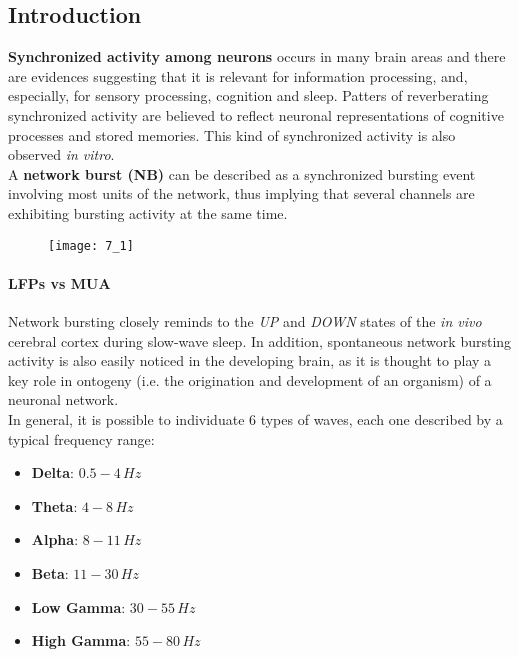 \subsection{Introduction}
\textbf{Synchronized activity among neurons} occurs in many brain areas and there are evidences
suggesting that it is relevant for information processing, and, especially, for sensory
processing, cognition and sleep. Patters of reverberating synchronized activity are
believed to reflect neuronal representations of cognitive processes and stored
memories. This kind of synchronized activity is also observed
\textit{in vitro}.\\
A \textbf{network burst (NB)} can be described as a synchronized bursting event involving most units of the network, thus implying that several channels are exhibiting bursting activity at the same time.
\begin{figure}[H]
    \texttt{[image: 7\_1]}
    \centering
\end{figure}

\paragraph{LFPs vs MUA}
Network bursting closely reminds to the \textit{UP} and \textit{DOWN} states 
of the \textit{in vivo} cerebral cortex during slow-wave sleep. 
In addition, spontaneous network bursting activity is also easily
noticed in the developing brain, as it is thought to play a key role in
ontogeny (i.e. the origination and development of an organism)
of a neuronal network.\\
In general, it is possible to individuate 6 types of waves, each one described by a typical frequency range:
\begin{itemize}
    \item \textbf{Delta}: \(0.5-4\,Hz\)
    \item \textbf{Theta}: \(4-8\,Hz\)
    \item \textbf{Alpha}: \(8-11\,Hz\)
    \item \textbf{Beta}: \(11-30\,Hz\)
    \item \textbf{Low Gamma}: \(30-55\,Hz\)
    \item \textbf{High Gamma}: \(55-80\,Hz\)
\end{itemize}
